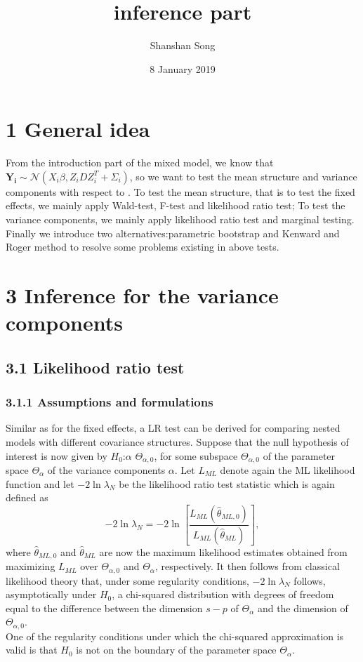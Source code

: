 \documentclass[12pt]{article}
\title{inference part}
\author{Shanshan Song}
\date{8 January 2019}
\begin{document}
\maketitle

\section*{1 General idea}
     \newcommand\iid{i.i.d.}
     \newcommand\pN{\mathcal{N}}
     From the introduction part of the mixed model, we know that $\boldsymbol{Y_i} \sim \pN(X_i\beta, Z_iDZ_i^T+\Sigma_i)$, so we want to test the mean structure and variance components with respect to . To test the mean structure, that is to test the fixed effects, we mainly apply Wald-test, F-test and likelihood ratio test; To test the variance components, we mainly apply likelihood ratio test and marginal testing. Finally we introduce two alternatives:parametric bootstrap and Kenward and Roger method to resolve some problems existing in above tests.
    
\section*{3 Inference for the variance components}
\subsection*{3.1 Likelihood ratio test}
\subsubsection*{3.1.1 Assumptions and formulations}
    Similar as for the fixed effects, a LR test can be derived for comparing nested models with different covariance structures. Suppose that the null hypothesis of interest is now given by $H_0$:$\alpha$ \in $\Theta_{\alpha,0}$, for some subspace $\Theta_{\alpha,0}$ of the parameter space $\Theta_\alpha$ of the variance components $\alpha$. Let $L_{ML}$ denote again the ML likelihood function and let $-2\ln{\lambda_N}$ be the likelihood ratio test statistic which is again defined as
    \begin{equation}
    -2\ln{\lambda_N} = -2\ln\left[{\frac{L_{ML}(\hat{\theta}_{ML,0})}{L_{ML}(\hat{\theta}_{ML})}}
    \right],
    \end{equation}
    where $\hat{\theta}_{ML,0}$ and $\hat{\theta}_{ML}$ are now the maximum likelihood estimates obtained from maximizing $L_{ML}$ over $\Theta_{\alpha,0}$ and $\Theta_\alpha$, respectively. It then follows from classical likelihood theory that, under some regularity conditions, $-2\ln{\lambda_N}$ follows, asymptotically under $H_0$, a chi-squared distribution with degrees of freedom equal to the difference between the dimension $s-p$ of $\Theta_\alpha$ and the dimension of $\Theta_{\alpha,0}$.
    \\ One of the regularity conditions under which the chi-squared approximation is valid is that $H_0$ is not on the boundary of the parameter space $\Theta_\alpha$.
\end{document}
